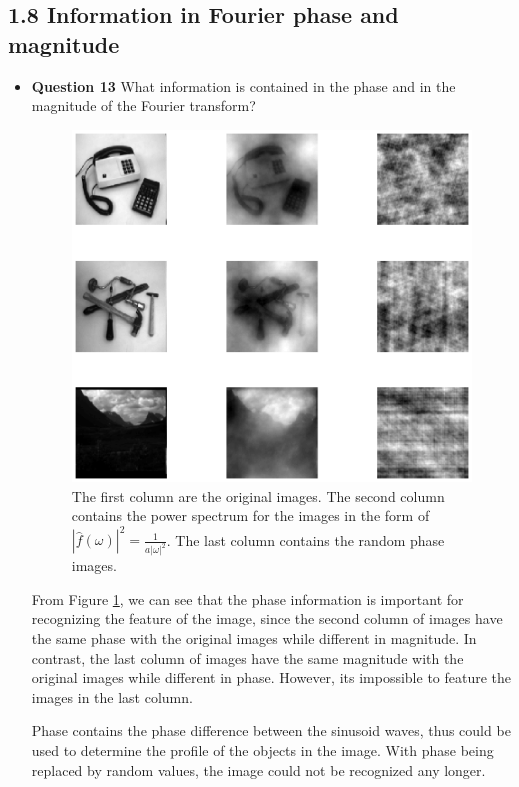 \documentclass[11pt,a4paper]{article}
\begin{document}
\subsection*{1.8 Information in Fourier phase and magnitude}
\begin{itemize}
	\item \textbf{Question 13} What information is contained in the phase and in the magnitude of the Fourier transform?
	\begin{figure}[!ht]
		\footnotesize
		\centering 
		\includegraphics[width=\columnwidth]{Q13.eps}
		\caption{The first column are the original images. The second column contains the power spectrum for the images in the form of $\left|\hat{f}(\omega)\right|^{2} = \frac{1}{a |\omega|^{2}}$. The last column contains the random phase images.}
		\label{fig:Q13}
	\end{figure}
	\par From Figure \ref{fig:Q13}, we can see that the phase information is important for recognizing the feature of the image, since the second column of images have the same phase with the original images while different in magnitude. In contrast, the last column of images have the same magnitude with the original images while different in phase. However, its impossible to feature the images in the last column.
	\par Phase contains the phase difference between the sinusoid waves, thus could be used to determine the profile of the objects in the image. With phase being replaced by random values, the image could not be recognized any longer.
\end{itemize}
\end{document}
